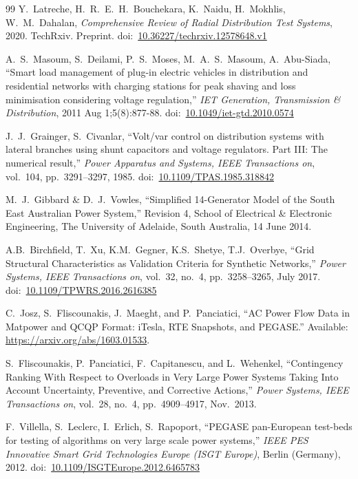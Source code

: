 \documentclass[12pt]{article}
\newcommand{\matpower}[0]{{\sc Matpower}}
\newcommand{\doi}[1]{doi:~\href{https://doi.org/#1}{#1}}
\numberwithin{equation}{section}
\numberwithin{table}{section}
\numberwithin{figure}{section}
\begin{document}
\begin{thebibliography}{99}
Y.~Latreche, H.~R.~E.~H.~Bouchekara, K.~Naidu, H.~Mokhlis, W.~M.~Dahalan, \emph{Comprehensive Review of Radial Distribution Test Systems}, 2020. TechRxiv. Preprint. \doi{10.36227/techrxiv.12578648.v1}

A.~S.~Masoum, S.~Deilami, P.~S.~Moses, M.~A.~S.~Masoum, A.~Abu-Siada, ``Smart load management of plug-in electric vehicles in distribution and residential networks with charging stations for peak shaving and loss minimisation considering voltage regulation,'' \emph{IET Generation, Transmission \& Distribution}, 2011 Aug 1;5(8):877-88.
\doi{10.1049/iet-gtd.2010.0574}

J.~J.~Grainger, S.~Civanlar, ``Volt/var control on distribution systems with lateral branches using shunt capacitors and voltage regulators. Part III: The numerical result,'' \emph{Power Apparatus and Systems, IEEE Transactions on}, vol.~104, pp.~3291--3297, 1985.
\doi{10.1109/TPAS.1985.318842}

 M.~J.~Gibbard \& D.~J.~Vowles, ``Simplified 14-Generator Model of the South East Australian Power System,'' Revision 4, School of Electrical \& Electronic Engineering, The University of Adelaide, South Australia, 14 June 2014.

A.B.~Birchfield, T.~Xu, K.M.~Gegner, K.S.~Shetye, T.J.~Overbye,
``Grid Structural Characteristics as Validation Criteria for Synthetic Networks,''  \emph{Power Systems, IEEE Transactions on}, vol.~32, no.~4, pp.~3258--3265, July 2017.
\doi{10.1109/TPWRS.2016.2616385}

C.~Josz, S.~Fliscounakis, J.~Maeght, and P.~Panciatici, ``AC Power
Flow Data in \matpower{} and QCQP Format: iTesla, RTE Snapshots, and PEGASE.''
Available: \url{https://arxiv.org/abs/1603.01533}.

S.~Fliscounakis, P.~Panciatici, F.~Capitanescu, and L.~Wehenkel, ``Contingency Ranking With Respect to Overloads in Very Large Power Systems Taking Into Account Uncertainty, Preventive, and Corrective Actions,'' \emph{Power Systems, IEEE Transactions on}, vol.~28, no.~4, pp.~4909--4917, Nov.~2013.

F.~Villella, S.~Leclerc, I.~Erlich, S.~Rapoport, ``PEGASE pan-European test-beds for testing of algorithms on very large scale power systems,'' \emph{IEEE PES Innovative Smart Grid Technologies Europe (ISGT Europe)}, Berlin (Germany), 2012.
\doi{10.1109/ISGTEurope.2012.6465783}


\end{thebibliography}
\end{document}
